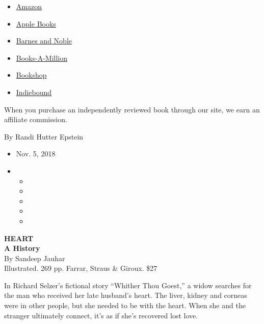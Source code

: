 \begin{itemize}
\tightlist
\item
  \href{https://www.amazon.com/gp/search?index=books\&tag=NYTBSREV-20\&field-keywords=Heart\%3A+A+History+Sandeep+Jauhar}{Amazon}
\item
  \href{https://du-gae-books-dot-nyt-du-prd.appspot.com/buy?title=Heart\%3A+A+History\&author=Sandeep+Jauhar}{Apple
  Books}
\item
  \href{https://www.anrdoezrs.net/click-7990613-11819508?url=https\%3A\%2F\%2Fwww.barnesandnoble.com\%2Fw\%2F\%3Fean\%3D9780374168650}{Barnes
  and Noble}
\item
  \href{https://www.anrdoezrs.net/click-7990613-35140?url=https\%3A\%2F\%2Fwww.booksamillion.com\%2Fp\%2FHeart\%253A\%2BA\%2BHistory\%2FSandeep\%2BJauhar\%2F9780374168650}{Books-A-Million}
\item
  \href{https://bookshop.org/a/3546/9780374168650}{Bookshop}
\item
  \href{https://www.indiebound.org/book/9780374168650?aff=NYT}{Indiebound}
\end{itemize}

When you purchase an independently reviewed book through our site, we
earn an affiliate commission.

By Randi Hutter Epstein

\begin{itemize}
\item
  Nov. 5, 2018
\item
  \begin{itemize}
  \item
  \item
  \item
  \item
  \item
  \end{itemize}
\end{itemize}

\textbf{HEART}\\
\textbf{A History}\\
By Sandeep Jauhar\\
Illustrated. 269 pp. Farrar, Straus \& Giroux. \$27

In Richard Selzer's fictional story ``Whither Thou Goest,'' a widow
searches for the man who received her late husband's heart. The liver,
kidney and corneas were in other people, but she needed to be with the
heart. When she and the stranger ultimately connect, it's as if she's
recovered lost love.

